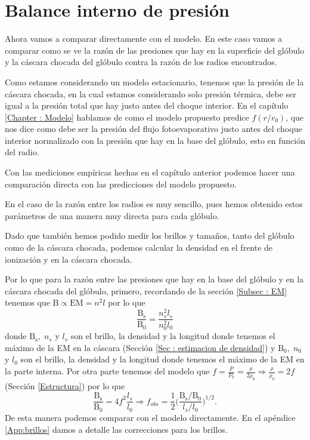 \documentclass{book}
\begin{document}
\section{Balance interno de presión}\label{Sec : comparacion-modelo}

Ahora vamos a comparar directamente con el modelo. En este caso vamos a comparar como se ve la razón de las presiones que hay en la superficie del glóbulo y la cáscara chocada del glóbulo contra la razón de los radios encontrados. 

Como estamos considerando un modelo estacionario, tenemos que la presión de la cáscara chocada, en la cual estamos considerando solo presión térmica, debe ser igual a la presión total que hay justo antes del choque interior. En el capítulo \ref{Chapter : Modelo} hablamos de como el modelo propuesto predice $f(r/r_0)$, que nos dice como debe ser la presión del flujo fotoevaporativo justo antes del choque interior normalizado con la presión que hay en la base del glóbulo, esto en función del radio. 

Con las mediciones empíricas hechas en el capítulo anterior podemos hacer una comparación directa con las predicciones del modelo propuesto. 

En el caso de la razón entre los radios es muy sencillo, pues hemos obtenido estos parámetros de una manera muy directa para cada glóbulo.

Dado que también hemos podido medir los brillos y tamaños, tanto del glóbulo como de la cáscara chocada, podemos calcular la densidad en el frente de ionización y en la cáscara chocada.

Por lo que para la razón entre las presiones que hay en la base del glóbulo y en la cáscara chocada del glóbulo, primero, recordando de la sección \ref{Subsec : EM} tenemos que $\mathrm{B}\propto \mathrm{EM}=n^2l$ por lo que
\begin{equation}
\frac{\mathrm{B_s}}{\mathrm{B_0}}=\frac{n_s^2l_s}{n_0^2l_0}
\end{equation}
donde $\mathrm{B_s}, \; n_s$ y $l_s$ son el brillo, la densidad y la longitud donde tenemos el máximo de la EM en la cáscara (Sección \ref{Sec : estimacion de densidad}) y  $\mathrm{B_0}, \; n_0$ y $l_0$ son el brillo, la densidad y la longitud donde tenemos el máximo de la EM en la parte interna. Por otra parte tenemos del modelo que $f = \frac{P}{P_0}=\frac{\rho}{2\rho_0} \Rightarrow \frac{\rho}{\rho_0}=2f$ (Sección \ref{Estructura}) por lo que
\begin{equation}
\frac{\mathrm{B_s}}{\mathrm{B_0}}=4f^2\frac{l_s}{l_0}\Rightarrow f_{obs}= \frac{1}{2}\Big(\frac{\mathrm{B_s}/\mathrm{B_0}}{l_s/l_0}\Big)^{1/2}.
\end{equation}
De esta manera podemos comparar con el modelo directamente. En el apéndice \ref{App:brillos} damos a detalle las correcciones para los brillos.
\end{document}
